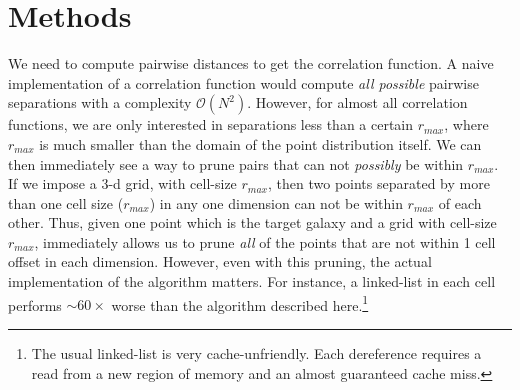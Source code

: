 \documentclass[preprint, 12pt, authoryear]{elsarticle}
\newcommand{\rmax}{\ensuremath{{r_{max}}}\xspace}
\begin{document}
\section{Methods}
We need to compute pairwise distances to get the correlation function. A naive implementation of a correlation function would compute {\em all possible} 
pairwise separations with a complexity $\mathcal{O}(N^2)$. However, for almost all correlation functions, we are only interested in separations less than 
a certain \rmax, where \rmax is much smaller than the domain of the point distribution itself. We can then immediately see a way to prune pairs that can not
{\em possibly} be within \rmax. If we impose a 3-d grid, with cell-size \rmax, then two points separated by more than one cell size (\rmax) in any one 
dimension can not be within \rmax of each other. Thus, given one point which is the target galaxy and a grid with cell-size \rmax, 
immediately allows us to prune {\em all} of the points that are not within 1 cell offset in each dimension. However, even with this pruning, the actual 
implementation of the algorithm matters. For instance, a linked-list in each cell performs $\sim 60\times$ worse than the algorithm described here.\footnote{The 
usual linked-list is very cache-unfriendly. Each dereference requires a read from a new region of memory and an almost guaranteed cache miss. } 
\end{document}
